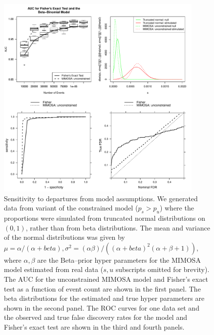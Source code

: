 \documentclass[11pt]{article}
\begin{document}
\begin{figure}[htbp] %
   \centering
   \includegraphics[width=4in]{Figures/simulations_violatedmodel} 
   \caption{Sensitivity to departures from model assumptions. We generated data from variant of the constrained model ($p_s>p_u$) where the proportions were simulated from truncated normal distributions on $(0,1)$, rather than from beta distributions. The mean and variance of the normal distributions was given by $\mu=\alpha/(\alpha+beta), \sigma^2=(\alpha\beta)/((\alpha+beta)^2(\alpha+\beta+1))$, where $\alpha,\beta$ are the Beta--prior hyper parameters for the MIMOSA model estimated from real data ($s, u$ subscripts omitted for brevity). The AUC for the unconstrained MIMOSA model and Fisher's exact test as a function of event count are shown in the first panel. The beta distributions for the estimated and true hyper parameters  are shown in the second panel. The ROC curves for one data set and the observed and true false discovery rates for the model and Fisher's exact test are shown in the third and fourth panels.}
   \label{fig:simulations_trunc}
\end{figure}
\end{document}
